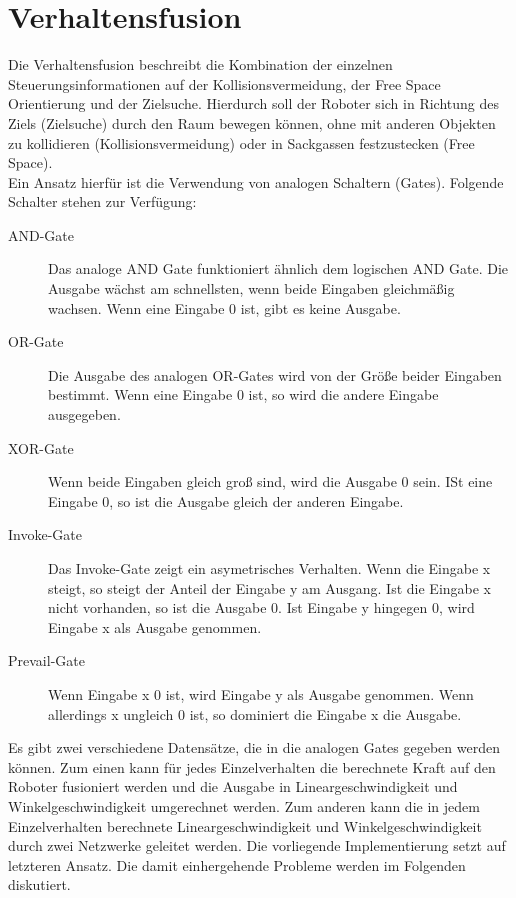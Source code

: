 \documentclass[12pt, a4paper]{report}
\begin{document}
\section{Verhaltensfusion}
Die Verhaltensfusion beschreibt die Kombination der einzelnen Steuerungsinformationen auf der Kollisionsvermeidung, der Free Space Orientierung und der Zielsuche. Hierdurch soll der Roboter sich in Richtung des Ziels (Zielsuche) durch den Raum bewegen können, ohne mit anderen Objekten zu kollidieren (Kollisionsvermeidung) oder in Sackgassen festzustecken (Free Space).
\\
Ein Ansatz hierfür ist die Verwendung von analogen Schaltern (Gates). Folgende Schalter stehen zur Verfügung:
\begin{description}
    \item[AND-Gate] Das analoge AND Gate funktioniert ähnlich dem logischen AND Gate. Die Ausgabe wächst am schnellsten, wenn beide Eingaben gleichmäßig wachsen. Wenn eine Eingabe 0 ist, gibt es keine Ausgabe.
    \item[OR-Gate] Die Ausgabe des analogen OR-Gates wird von der Größe beider Eingaben bestimmt. Wenn eine Eingabe 0 ist, so wird die andere Eingabe ausgegeben.
    \item[XOR-Gate] Wenn beide Eingaben gleich groß sind, wird die Ausgabe 0 sein. ISt eine Eingabe 0, so ist die Ausgabe gleich der anderen Eingabe.
    \item[Invoke-Gate] Das Invoke-Gate zeigt ein asymetrisches Verhalten. Wenn die Eingabe x steigt, so steigt der Anteil der Eingabe y am Ausgang. Ist die Eingabe x nicht vorhanden, so ist die Ausgabe 0. Ist Eingabe y hingegen 0, wird Eingabe x als Ausgabe genommen.
    \item[Prevail-Gate]  Wenn Eingabe x 0 ist, wird Eingabe y als Ausgabe genommen. Wenn allerdings x ungleich 0 ist, so dominiert die Eingabe x die Ausgabe.
\end{description}   

Es gibt zwei verschiedene Datensätze, die in die analogen Gates gegeben werden können. Zum einen kann für jedes Einzelverhalten die berechnete Kraft auf den Roboter fusioniert werden und die Ausgabe in Lineargeschwindigkeit und Winkelgeschwindigkeit umgerechnet werden. Zum anderen kann die in jedem Einzelverhalten berechnete Lineargeschwindigkeit und Winkelgeschwindigkeit durch zwei Netzwerke geleitet werden. Die vorliegende Implementierung setzt auf letzteren Ansatz. Die damit einhergehende Probleme werden im Folgenden diskutiert.
\end{document}
